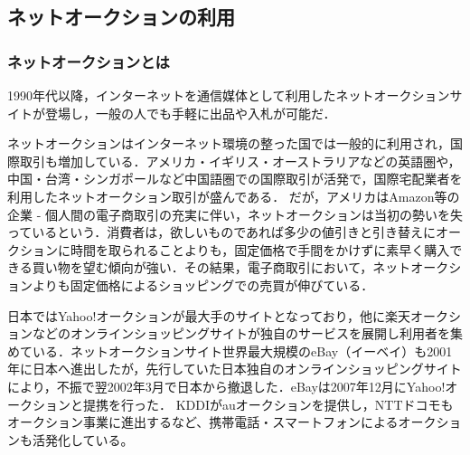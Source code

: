 \subsection{ネットオークションの利用}

\subsubsection{ネットオークションとは}

1990年代以降，インターネットを通信媒体として利用したネットオークションサイトが登場し，一般の人でも手軽に出品や入札が可能だ．

ネットオークションはインターネット環境の整った国では一般的に利用され，国際取引も増加している．アメリカ・イギリス・オーストラリアなどの英語圏や，中国・台湾・シンガポールなど中国語圏での国際取引が活発で，国際宅配業者を利用したネットオークション取引が盛んである．
だが，アメリカはAmazon等の企業 - 個人間の電子商取引の充実に伴い，ネットオークションは当初の勢いを失っているという．消費者は，欲しいものであれば多少の値引きと引き替えにオークションに時間を取られることよりも，固定価格で手間をかけずに素早く購入できる買い物を望む傾向が強い．その結果，電子商取引において，ネットオークションよりも固定価格によるショッピングでの売買が伸びている．

日本ではYahoo!オークションが最大手のサイトとなっており，他に楽天オークションなどのオンラインショッピングサイトが独自のサービスを展開し利用者を集めている．ネットオークションサイト世界最大規模のeBay（イーベイ）も2001年に日本へ進出したが，先行していた日本独自のオンラインショッピングサイトにより，不振で翌2002年3月で日本から撤退した．eBayは2007年12月にYahoo!オークションと提携を行った．
KDDIがauオークションを提供し，NTTドコモもオークション事業に進出するなど、携帯電話・スマートフォンによるオークションも活発化している。

